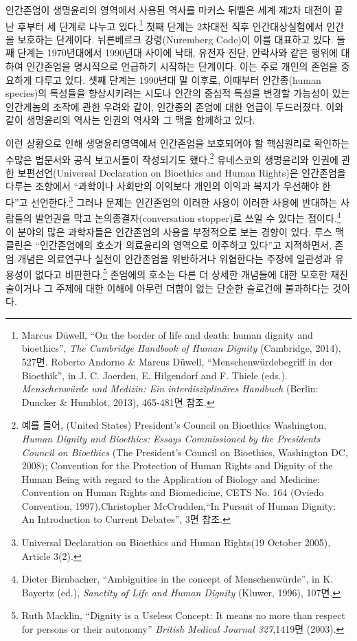 인간존엄이 생명윤리의 영역에서 사용된 역사를 마커스 뒤벨은 세계 제2차 대전이 끝난 후부터 세 단계로 나누고 있다.\footnote{Marcus Düwell, ``On the border of life and death: human dignity and bioethics'', \emph{The Cambridge Handbook of Human Dignity} (Cambridge, 2014), 527면. Roberto Andorno \& Marcus Düwell, ``Menschenwürdebegriff in der Bioethik'', in J. C. Joerden, E. Hilgendorf and F. Thiele (eds.). \emph{Menschenwürde und Medizin: Ein interdisziplinäres Handbuch} (Berlin: Duncker \& Humblot, 2013), 465-481면 참조.} 첫째 단계는 2차대전 직후 인간대상실험에서 인간을 보호하는 단계이다. 뉘른베르크 강령(Nuremberg Code)이 이를 대표하고 있다. 둘째 단계는 1970년대에서 1990년대 사이에 낙태, 유전자 진단, 안락사와 같은 행위에 대하여 인간존엄을 명시적으로 언급하기 시작하는 단계이다. 이는 주로 개인의 존엄을 중요하게 다루고 있다. 셋째 단계는 1990년대 말 이후로, 이때부터 인간종(human species)의 특성들을 향상시키려는 시도나 인간의 중심적 특성을 변경할 가능성이 있는 인간게놈의 조작에 관한 우려와 같이, 인간종의 존엄에 대한 언급이 두드러졌다. 이와 같이 생명윤리의 역사는 인권의 역사와 그 맥을 함께하고 있다.

이런 상황으로 인해 생명윤리영역에서 인간존엄을 보호되어야 할 핵심원리로 확인하는 수많은 법문서와 공식 보고서들이 작성되기도 했다.\footnote{예를 들어, (United States) President's Council on Bioethics Washington, \emph{Human Dignity and Bioethics: Essays Commissioned by the Presidents Council on Bioethics} (The President's Council on Bioethics, Washington DC, 2008); Convention for the Protection of Human Rights and Dignity of the Human Being with regard to the Application of Biology and Medicine: Convention on Human Rights and Biomedicine, CETS No. 164 (Oviedo Convention, 1997).Christopher McCrudden,``In Pursuit of Human Dignity: An Introduction to Current Debates'', 3면 참조.} 유네스코의 생명윤리와 인권에 관한 보편선언(Universal Declaration on Bioethics and Human Rights)은 인간존엄을 다루는 조항에서 ``과학이나 사회만의 이익보다 개인의 이익과 복지가 우선해야 한다''고 선언한다.\footnote{Universal Declaration on Bioethics and Human Rights(19 October 2005), Article 3(2).} 그러나 문제는 인간존엄의 이러한 사용이 이러한 사용에 반대하는 사람들의 발언권을 막고 논의종결자(conversation stopper)로 쓰일 수 있다는 점이다.\footnote{Dieter Birnbacher, ``Ambiguities in the concept of Menschenwürde'', in K. Bayertz (ed.), \emph{Sanctity of Life and Human Dignity} (Kluwer, 1996), 107면.} 이 분야의 많은 과학자들은 인간존엄의 사용을 부정적으로 보는 경향이 있다. 루스 맥클린은 ``인간존엄에의 호소가 의료윤리의 영역으로 이주하고 있다''고 지적하면서, 존엄 개념은 의료연구나 실천이 인간존엄을 위반하거나 위협한다는 주장에 일관성과 유용성이 없다고 비판한다.\footnote{Ruth Macklin, ``Dignity is a Useless Concept: It means no more than respect for persons or their autonomy'' \emph{British Medical Journal 327},1419면 (2003).} 존엄에의 호소는 다른 더 상세한 개념들에 대한 모호한 재진술이거나 그 주제에 대한 이해에 아무런 더함이 없는 단순한 슬로건에 불과하다는 것이다.

